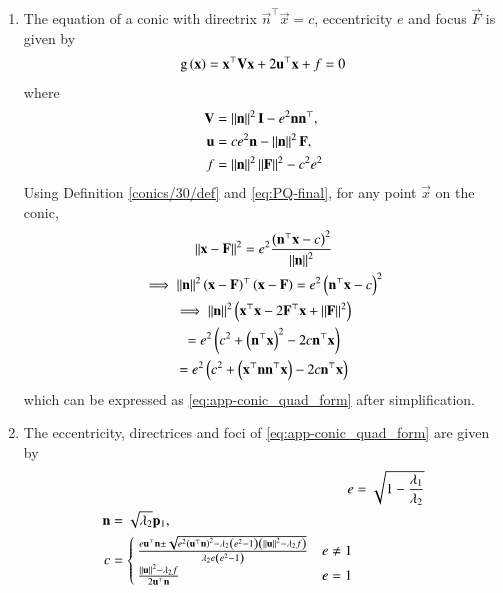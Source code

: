 \begin{enumerate}[label=\thesubsection.\arabic*.,ref=\thesubsection.\theenumi]
\item
The equation of  a conic with directrix $\vec{n}^{\top}\vec{x} = c$, eccentricity $e$ and focus $\vec{F}$ is given by 
\begin{align}
    \label{eq:app-conic_quad_form}
	\text{g}\left(\mathbf{x}\right) = \mathbf{x}^{\top}\mathbf{V}\mathbf{x}+2\mathbf{u}^{\top}\mathbf{x}+f=0
    \end{align}
where     
\begin{align}
  \label{eq:app-conic_quad_form_v}
\mathbf{V} &=\left\lVert\mathbf{n}\right\rVert^2\mathbf{I}-e^2\mathbf{n}\mathbf{n}^{\top}, 
\\
\label{eq:app-conic_quad_form_u}
\mathbf{u} &= ce^2\mathbf{n}-\left\lVert\mathbf{n}\right\rVert^2\mathbf{F}, 
\\
\label{eq:app-conic_quad_form_f}
f &= \left\lVert\mathbf{n}\right\rVert^2\left\lVert\mathbf{F}\right\rVert^2-c^2e^2
    \end{align}
    \solution
  Using Definition \ref{conics/30/def} and 
			\eqref{eq:PQ-final},
for any point $\vec{x}$ on the conic,
\begin{multline}
\left\lVert\mathbf{x}-\mathbf{F}\right\rVert^2=e^2 \frac{\left({\mathbf{n}^{\top}\mathbf{x} - c}\right)^2}{\left\lVert\mathbf{n}\right\rVert^2}\label{conics/30/eq:1} \\
\implies \left\lVert\mathbf{n}\right\rVert^2\left(\mathbf{x}-\mathbf{F}\right)^{\top}\left(\mathbf{x}-\mathbf{F}\right)=e^2\left(\mathbf{n}^{\top}\mathbf{x} - c\right)^2
\\
\implies \left\lVert\mathbf{n}\right\rVert^2\left(\mathbf{x}^{\top}\mathbf{x}-2\mathbf{F}^{\top}\mathbf{x}+\left\lVert\mathbf{F}\right\rVert^2\right)
	\\
	=e^2\left(c^2+\left(\mathbf{n}^{\top}\mathbf{x} \right)^2-2c\mathbf{n}^{\top}\mathbf{x}\right) \\
=e^2\left(c^2+\left(\mathbf{x}^{\top}\mathbf{n}\mathbf{n}^{\top}\mathbf{x} \right)-2c\mathbf{n}^{\top}\mathbf{x}\right)
\end{multline}
%
which can be expressed as \eqref{eq:app-conic_quad_form} after simplification.
\item
  The eccentricity, directrices and foci of \eqref{eq:app-conic_quad_form} are given by 
\begin{align}
  \label{eq:app-conic_quad_form_e} 
  e&= \sqrt{1-\frac{\lambda_1}{\lambda_2}}
\\
\label{eq:app-conic_quad_form_nc} 
	\begin{split}
  \mathbf{n}&= \sqrt{\lambda_2}\mathbf{p}_1,  
  \\
	c &= 
  \begin{cases}
    \frac{e\mathbf{u}^{\top}\mathbf{n} \pm \sqrt{e^2\left(\mathbf{u}^{\top}\mathbf{n}\right)^2-\lambda_2\left(e^2-1\right)\left(\left\lVert\mathbf{u}\right\rVert^2 - \lambda_2 f\right)}}{\lambda_2e\left(e^2-1\right)} & e \ne 1
    \\
    \frac{\left\lVert\mathbf{u}\right\rVert^2 - \lambda_2 f   }{2\mathbf{u}^{\top}\mathbf{n}} & e = 1

\end{cases}
\end{split}
\end{align}
\end{enumerate}
